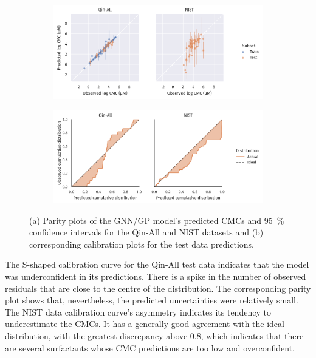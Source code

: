 \begin{figure}
    \centering
    \begin{subfigure}{\textwidth}
        \includegraphics[width=\textwidth]{images/uq-parity.pdf}
        \caption{}
        \label{fig:uq-parity}
    \end{subfigure}
    \begin{subfigure}{\textwidth}
        \includegraphics[width=\textwidth]{images/uq-calibration.pdf}
        \caption{}
        \label{fig:uq-calibration}
    \end{subfigure}
    \caption{(a) Parity plots of the GNN/GP model's predicted CMCs and \SI{95}{\%}
        confidence intervals for the Qin-All and NIST datasets and (b) corresponding
        calibration plots for the test data predictions.}
\end{figure}

The S-shaped calibration curve for the Qin-All test data indicates that the
model was underconfident in its predictions. There is a spike in the number of
observed residuals that are close to the centre of the distribution. The
corresponding parity plot shows that, nevertheless, the predicted uncertainties
were relatively small. The NIST data calibration curve's asymmetry indicates its
tendency to underestimate the CMCs. It has a generally good agreement with the
ideal distribution, with the greatest discrepancy above \num{0.8}, which
indicates that there are several surfactants whose CMC predictions are too low
and overconfident.

